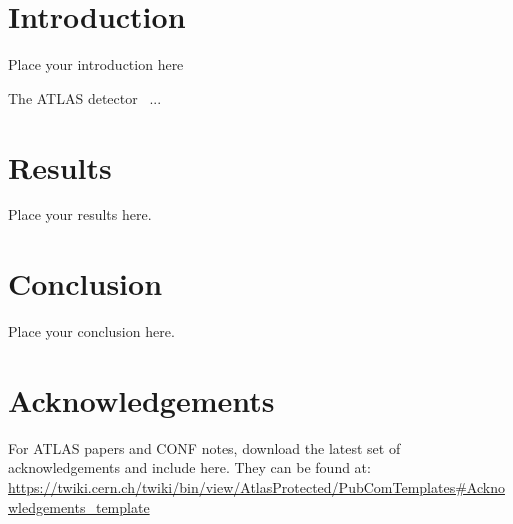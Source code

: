 \documentclass[UKenglish,texmf]{atlasdoc}
\begin{document}
\tableofcontents


\section{Introduction}
\label{sec:intro}

Place your introduction here



The ATLAS detector~\cite{atlas-detector} ...
% 


\section{Results}
\label{sec:result}

Place your results here.


\section{Conclusion}
\label{sec:conclusion}

Place your conclusion here.


\section*{Acknowledgements}

For ATLAS papers and CONF notes, download the latest set of acknowledgements and include here.
They can be found at:\\
\url{https://twiki.cern.ch/twiki/bin/view/AtlasProtected/PubComTemplates#Acknowledgements_template}
\end{document}
